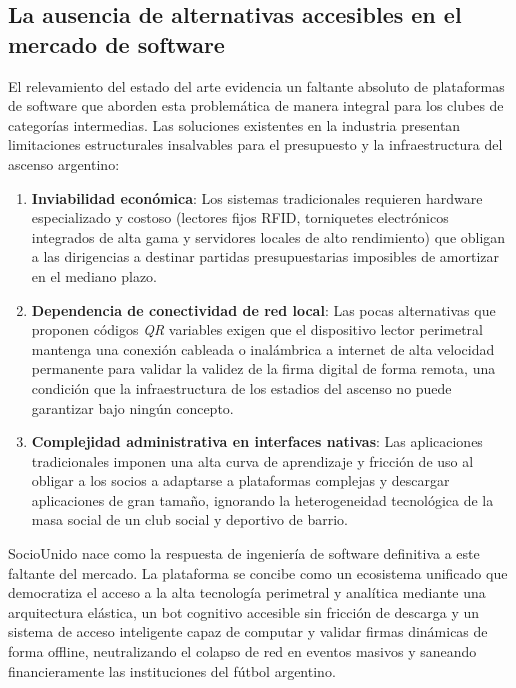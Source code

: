 \subsection{La ausencia de alternativas accesibles en el mercado de software}

El relevamiento del estado del arte evidencia un faltante absoluto de plataformas de software que aborden esta problemática de manera integral para los clubes de categorías intermedias. Las soluciones existentes en la industria presentan limitaciones estructurales insalvables para el presupuesto y la infraestructura del ascenso argentino:

\begin{enumerate}
    \item \textbf{Inviabilidad económica}: Los sistemas tradicionales requieren hardware especializado y costoso (lectores fijos RFID, torniquetes electrónicos integrados de alta gama y servidores locales de alto rendimiento) que obligan a las dirigencias a destinar partidas presupuestarias imposibles de amortizar en el mediano plazo.
    \item \textbf{Dependencia de conectividad de red local}: Las pocas alternativas que proponen códigos \textit{QR} variables exigen que el dispositivo lector perimetral mantenga una conexión cableada o inalámbrica a internet de alta velocidad permanente para validar la validez de la firma digital de forma remota, una condición que la infraestructura de los estadios del ascenso no puede garantizar bajo ningún concepto.
    \item \textbf{Complejidad administrativa en interfaces nativas}: Las aplicaciones tradicionales imponen una alta curva de aprendizaje y fricción de uso al obligar a los socios a adaptarse a plataformas complejas y descargar aplicaciones de gran tamaño, ignorando la heterogeneidad tecnológica de la masa social de un club social y deportivo de barrio.
\end{enumerate}

SocioUnido nace como la respuesta de ingeniería de software definitiva a este faltante del mercado. La plataforma se concibe como un ecosistema unificado que democratiza el acceso a la alta tecnología perimetral y analítica mediante una arquitectura elástica, un bot cognitivo accesible sin fricción de descarga y un sistema de acceso inteligente capaz de computar y validar firmas dinámicas de forma offline, neutralizando el colapso de red en eventos masivos y saneando financieramente las instituciones del fútbol argentino.
